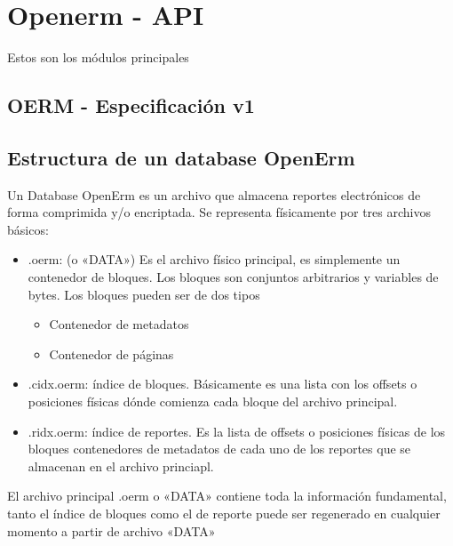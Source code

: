 \documentclass[a4paper,12pt,spanish]{sphinxmanual}
\begin{document}
\chapter{Openerm - API}
\label{\detokenize{index:openerm-api}}
Estos son los módulos principales


\section{OERM - Especificación v1}
\label{\detokenize{especificacion:oerm-especificacion-v1}}\label{\detokenize{especificacion::doc}}

\section{Estructura de un database OpenErm}
\label{\detokenize{especificacion:estructura-de-un-database-openerm}}
Un Database OpenErm es un archivo que almacena reportes electrónicos de forma comprimida y/o
encriptada. Se representa físicamente por tres archivos básicos:
\begin{itemize}
\item {} 
.oerm: (o «DATA») Es el archivo físico principal, es simplemente un contenedor
de bloques. Los bloques son conjuntos arbitrarios y variables de bytes. Los
bloques pueden ser de dos tipos
\begin{itemize}
\item {} 
Contenedor de metadatos

\item {} 
Contenedor de páginas

\end{itemize}

\item {} 
.cidx.oerm: índice de bloques. Básicamente es una lista con los offsets o
posiciones físicas dónde comienza cada bloque del archivo principal.

\item {} 
.ridx.oerm: índice de reportes. Es la lista de offsets o posiciones
físicas de los bloques contenedores de metadatos de cada uno de los reportes que se
almacenan en el archivo princiapl.

\end{itemize}

El archivo principal .oerm o «DATA» contiene toda la información fundamental,
tanto el índice de bloques como el de reporte puede ser regenerado en cualquier momento a
partir de archivo «DATA»
\end{document}
